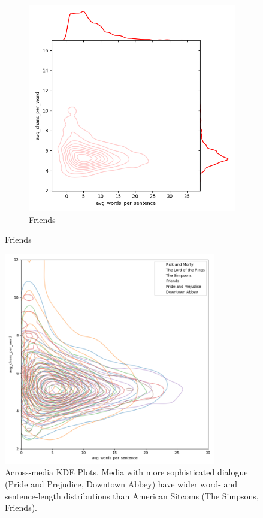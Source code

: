 \documentclass{article}
\newcommand{\largeimagewidth}{350}
\begin{document}
\begin{titlepage}
\begin{figure}[H]
\begin{subfigure}[b]{0.45\textwidth}
        \includegraphics[width=\textwidth]{images/3d_kde_test_1.png}
        \caption{Friends}
        \label{fig:subfig2}
    \end{subfigure}
    \label{fig:main}
\end{figure} 

\begin{figure}[H]
\centering
\includegraphics[width=\largeimagewidth]{images/3d_kde_test_final.png}
\caption{Across-media KDE Plots. Media with more sophisticated dialogue (Pride and Prejudice, Downtown Abbey) have wider word- and sentence-length distributions than American Sitcoms (The Simpsons, Friends).}
\end{figure}


\end{titlepage}
\end{document}
